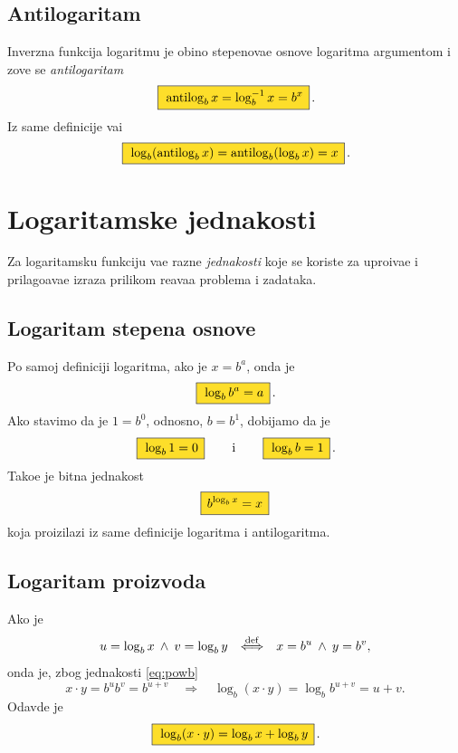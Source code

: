 \documentclass[12pt, twoside, a4paper]{article}
\def\idx#1{#1\index{#1}}
\def\land{\mathbin{\>\wedge\>}}
\def\logb{\log_b}
\def\okvir#1{\,\fcolorbox{black}{Goldenrod}{$\,\displaystyle{\mathstrut #1}\,$}\,}
\def\sledi{{\quad\Rightarrow\quad}}
\def\podef{{\quad\buildrel\rm def\over\Longleftrightarrow\quad}}
\begin{document}
\subsection{Antilogaritam}

\def\antilog{\mathop{\rm antilog}\nolimits}
Inverzna funkcija logaritmu
je obi{\cv}no stepenova{\nj}e osnove logaritma argumentom i zove se {\sl\idx{antilogaritam}}
\begin{equation}
\okvir{\antilog_b x = \logb^{-1}x =  b^x}.
\end{equation}
Iz same definicije va{\zv}i
\begin{equation}
\okvir{\log_b(\antilog_b x)=\antilog_b(\log_b x)=x}.
\end{equation}


\section{Logaritamske jednakosti}

Za logaritamsku funkciju va{\zv}e razne {\sl jednakosti\/} koje se koriste za 
upro{\sv}{\cc}iva{\nj}e i pri\-la\-go\-{\dj}a\-va\-{\nj}e izraza prilikom re{\sv}ava{\nj}a
problema i zadataka.

\subsection{Logaritam stepena osnove}

Po samoj definiciji logaritma, ako je $x=b^a$, onda je
\begin{equation}
\okvir{\logb b^a=a}.
\label{eq:powb}
\end{equation}
Ako stavimo da je $1=b^0$, odnosno, $b=b^1$, dobijamo da je
\begin{equation}
\okvir{\logb 1=0}\qquad\text{i}\qquad\okvir{\logb b=1}.
\end{equation}
Tako{\dj}e je bitna jednakost
\begin{equation}
\okvir{b^{\logb x}=x}
\end{equation}
koja proizilazi iz same definicije logaritma i antilogaritma.

\subsection{Logaritam proizvoda}

Ako je
$$
u=\logb x\land v=\log_b y \podef x=b^u\land y=b^v,
$$
onda je, zbog jednakosti \eqref{eq:powb}
$$
x\cdot y=b^ub^v=b^{u+v}\sledi \logb(x\cdot y)=\logb b^{u+v}=u+v.
$$
Odavde je
\begin{equation}
\okvir{\logb(x\cdot y)=\logb x+\logb y}.
\label{eq:lnmul}
\end{equation}
\end{document}
